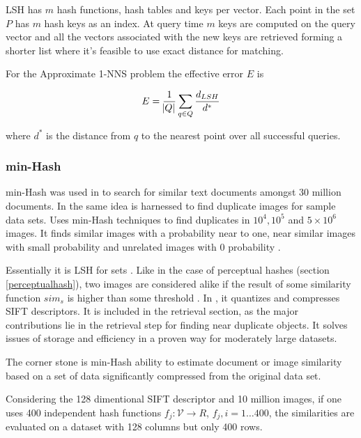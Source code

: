 \documentclass[english,12pt,a4paper,pdftex,elec,utf8]{aaltothesis}
\begin{document}
LSH has $m$ hash functions, hash tables and keys per vector. Each point in the set $P$ has $m$ hash keys as an index. At query time $m$ keys are computed on the query vector and all the vectors associated with the new keys are retrieved forming a shorter list where it's feasible to use exact distance for matching.





For the Approximate 1-NNS problem the effective error $E$ is

\begin{equation}
  \label{lsherroreq}
E = \frac{1}{\abs{Q}}\sum_{q\in Q}\frac{d_{LSH}}{d^*}
  \end{equation}

where $d^*$ is the distance from $q$ to the nearest point over all successful queries.


\subsubsection{min-Hash}
min-Hash was used in \cite{Broder1997} to search for similar text documents amongst 30 million documents. In \cite{Chum2008} the same idea is harnessed to find duplicate images for sample data sets. \cite{Chum2010} Uses min-Hash techniques to find duplicates in $10^4, 10^5$ and $5 \times 10^6$ images. It finds similar images with a probability near to one, near similar images with small probability and unrelated images with 0 probability \cite{Chum2010}.

Essentially it is LSH for sets \cite{Chum2010}. Like in the case of perceptual hashes (section \ref{perceptualhash}), two images are considered alike if the result of some similarity function $sim_s$ is higher than some threshold \cite{Chum2008}. In \cite{Chum2008}, it quantizes and compresses SIFT descriptors. It is included in the retrieval section, as the major contributions lie in the retrieval step for finding near duplicate objects. It solves issues of storage and efficiency in a proven way for moderately large datasets.

The corner stone is min-Hash ability to estimate document or image similarity based on a set of data significantly compressed from the original data set.

Considering the 128 dimentional SIFT descriptor and 10 million images, if one uses 400 independent hash functions $f_j:\mathcal{V} \rightarrow R$, $f_j, i = 1 \ldots 400$, the similarities are evaluated on a dataset with 128 columns but only 400 rows.
\end{document}
